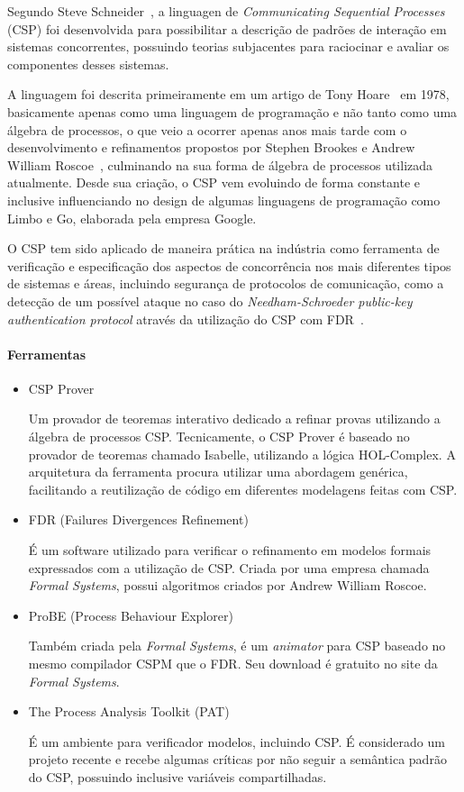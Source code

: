 Segundo Steve Schneider~\cite{Schneider:1999:CRT:555233}, a linguagen de \textit{Communicating Sequential Processes}
(CSP) foi desenvolvida para possibilitar a descrição de padrões de interação em sistemas concorrentes,
possuindo teorias subjacentes para raciocinar e avaliar os componentes desses sistemas.

A linguagem foi descrita primeiramente em um artigo de Tony Hoare~\cite{Hoare:1978:CSP:359576.359585} em 1978,
basicamente apenas como uma linguagem de programação e não tanto como uma álgebra de processos, o que veio a ocorrer
apenas anos mais tarde com o desenvolvimento e refinamentos propostos por Stephen Brookes e Andrew William Roscoe~\cite{Brookes:1984:TCS:828.833},
culminando na sua forma de álgebra de processos utilizada atualmente.
Desde sua criação, o CSP vem evoluindo de forma constante e inclusive influenciando no design de algumas linguagens
de programação como Limbo e Go, elaborada pela empresa Google.

O CSP tem sido aplicado de maneira prática na indústria como ferramenta de verificação e especificação dos aspectos
de concorrência nos mais diferentes tipos de sistemas e áreas, incluindo segurança de protocolos de comunicação,
como a detecção de um possível ataque no caso do \textit{Needham-Schroeder public-key authentication protocol}
através da utilização do CSP com FDR~\cite{Lowe:1996:BFN:646480.693776}.

\paragraph{Ferramentas}

\begin{itemize}
\item{CSP Prover}

Um provador de teoremas interativo dedicado a refinar provas utilizando a álgebra de processos CSP. Tecnicamente,
o CSP Prover é baseado no provador de teoremas chamado Isabelle, utilizando a lógica HOL-Complex. A arquitetura
da ferramenta procura utilizar uma abordagem genérica, facilitando a reutilização de código em diferentes modelagens
feitas com CSP.

\item{FDR (Failures Divergences Refinement)}

É um software utilizado para verificar o refinamento em modelos formais expressados com a utilização de CSP.
Criada por uma empresa chamada \textit{Formal Systems}, possui algoritmos criados por Andrew William Roscoe.

\item{ProBE (Process Behaviour Explorer)}

Também criada pela \textit{Formal Systems}, é um \textit{animator} para CSP baseado no mesmo compilador CSPM que o FDR.
Seu download é gratuito no site da \textit{Formal Systems}.

\item{The Process Analysis Toolkit (PAT)}

É um ambiente para verificador modelos, incluindo CSP. É considerado um projeto recente e recebe algumas críticas
por não seguir a semântica padrão do CSP, possuindo inclusive variáveis compartilhadas.

\end{itemize}

